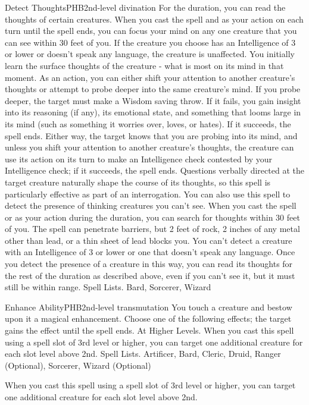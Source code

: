 \begin{spell}{Detect Thoughts}{PHB}{2nd-level divination}
{
}
For the duration, you can read the thoughts of certain creatures. When you cast the spell and as your action on each turn until the spell ends, you can focus your mind on any one creature that you can see within 30 feet of you. If the creature you choose has an Intelligence of 3 or lower or doesn’t speak any language, the creature is unaffected.
You initially learn the surface thoughts of the creature - what is most on its mind in that moment. As an action, you can either shift your attention to another creature’s thoughts or attempt to probe deeper into the same creature’s mind. If you probe deeper, the target must make a Wisdom saving throw. If it fails, you gain insight into its reasoning (if any), its emotional state, and something that looms large in its mind (such as something it worries over, loves, or hates). If it succeeds, the spell ends. Either way, the target knows that you are probing into its mind, and unless you shift your attention to another creature’s thoughts, the creature can use its action on its turn to make an Intelligence check contested by your Intelligence check; if it succeeds, the spell ends.
Questions verbally directed at the target creature naturally shape the course of its thoughts, so this spell is particularly effective as part of an interrogation.
You can also use this spell to detect the presence of thinking creatures you can’t see. When you cast the spell or as your action during the duration, you can search for thoughts within 30 feet of you. The spell can penetrate barriers, but 2 feet of rock, 2 inches of any metal other than lead, or a thin sheet of lead blocks you. You can’t detect a creature with an Intelligence of 3 or lower or one that doesn’t speak any language.
Once you detect the presence of a creature in this way, you can read its thoughts for the rest of the duration as described above, even if you can’t see it, but it must still be within range.
Spell Lists. Bard, Sorcerer, Wizard
\end{spell}

\begin{spell}{Enhance Ability}{PHB}{2nd-level transmutation}
{
}
You touch a creature and bestow upon it a magical enhancement. Choose one of the following effects; the target gains the effect until the spell ends.
At Higher Levels. When you cast this spell using a spell slot of 3rd level or higher, you can target one additional creature for each slot level above 2nd.
Spell Lists. Artificer, Bard, Cleric, Druid, Ranger (Optional), Sorcerer, Wizard (Optional)

 When you cast this spell using a spell slot of 3rd level or higher, you can target one additional creature for each slot level above 2nd.
\end{spell}


